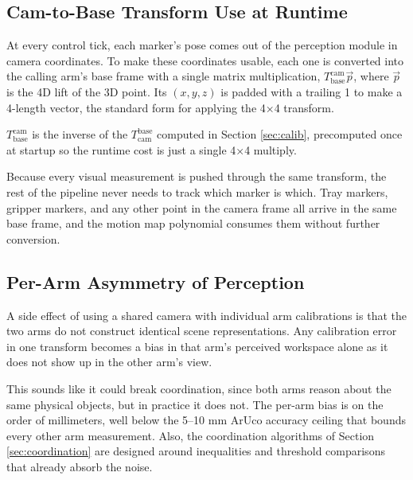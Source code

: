 \subsection{Cam-to-Base Transform Use at Runtime}
At every control tick, each marker's pose comes out of the perception module in camera coordinates. To make these coordinates usable, each one is converted into the calling arm's base frame with a single matrix multiplication, $T_{\text{base}}^{\text{cam}} {\vec{p}}$,
where ${\vec{p}}$ is the 4D lift of the 3D point. Its $(x, y, z)$ is padded with a trailing 1 to make a 4-length vector, the standard form for applying the 4×4 transform.

$T_\text{base}^\text{cam}$ is the inverse of the $T_\text{cam}^\text{base}$ computed in Section \ref{sec:calib}, precomputed once at startup so the runtime cost is just a single 4×4 multiply.

Because every visual measurement is pushed through the same transform, the rest of the pipeline never needs to track which marker is which. Tray markers, gripper markers, and any other point in the camera frame all arrive in the same base frame, and the motion map polynomial consumes them without further conversion.

\subsection{Per-Arm Asymmetry of Perception}
A side effect of using a shared camera with individual arm calibrations is that the two arms do not construct identical scene representations. Any calibration error in one transform becomes a bias in that arm's perceived workspace alone as it does not show up in the other arm's view.


This sounds like it could break coordination, since both arms reason about the same physical objects, but in practice it does not. The per-arm bias is on the order of millimeters, well below the 5–10 mm ArUco accuracy ceiling that bounds every other arm measurement. Also, the coordination algorithms of Section \ref{sec:coordination} are designed around inequalities and threshold comparisons that already absorb the noise.

